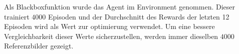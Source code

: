 Als Blackboxfunktion wurde das Agent im Environment genommen. Dieser trainiert
$4000$ Episoden und der Durchschnitt des Rewards der letzten 12 Episoden wird
als Wert zur optimierung verwendet. Um eine bessere Vergleichbarkeit dieser
Werte sicherzustellen, werden immer dieselben $4000$ Referenzbilder gezeigt.
